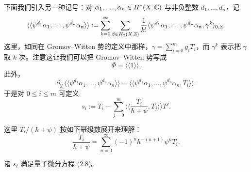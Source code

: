 
下面我们引入另一种记号：对 $\alpha_1,\dots,\alpha_n\in H^*(X,\mathbb{C})$ 与非负整数 $d_1,\dots,d_n$，记
\[
\langle\langle\psi^{d_1}\alpha_1,\dots,\psi^{d_n}\alpha_n\rangle\rangle
:=\sum_{k=0}^{\infty}\sum_{\beta\in H_2(X,\mathbb{Z})}\frac{1}{k!}\langle\psi^{d_1}\alpha_1,\dots,\psi^{d_n}\alpha_n,\gamma^k\rangle_{0,\beta}.
\]
这里，如同在 Gromov–Witten 势的定义中那样，$\gamma=\sum_{i=0}^m y_iT_i$，而 $\gamma^k$ 表示把 $\gamma$ 取 $k$ 次。注意这让我们可以把 Gromov–Witten 势写成
\[
\Phi=\langle\langle1\rangle\rangle.
\]
此外，
\[
\partial_{y_i}\langle\langle\psi^{d_1}\alpha_1,\dots,\psi^{d_n}\alpha_n\rangle\rangle
=\langle\langle\psi^{d_1}\alpha_1,\dots,\psi^{d_n}\alpha_n,T_i\rangle\rangle.
\]
于是对 $0\le i\le m$ 可定义
\[
s_i:=T_i-\sum_{j=0}^m\Big\langle\Big\langle\frac{T_i}{\hbar+\psi},T_j\Big\rangle\Big\rangle T^j.
\]

这里 $T_i/(\hbar+\psi)$ 按如下幂级数展开来理解：
\[
\frac{T_i}{\hbar+\psi}=\sum_{n=0}^{\infty}(-1)^n\hbar^{-(n+1)}\psi^nT_i.
\]

\begin{theorem}
诸 $s_i$ 满足量子微分方程 (2.8)。
\end{theorem}

